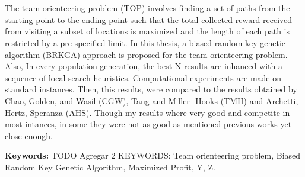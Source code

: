 \chapter*{\tituloAbstractEn}

\noindent The team orienteering problem (TOP) involves finding a set of paths from the starting point to the ending point such that the total collected reward received from visiting a subset of locations is maximized and the length of each path is restricted by a pre-specified limit. In this thesis, a biased random key genetic algorithm (BRKGA) approach is proposed for the team orienteering problem. Also, In every population generation, the best N results are inhanced with a sequence of local search heuristics. Computational experiments are made on standard instances. Then, this results, were compared to the results obtained by Chao, Golden, and Wasil (CGW), Tang and Miller-
Hooks (TMH) and Archetti, Hertz, Speranza (AHS). Though my results where very good and competite in most intances, in some they were not as good as mentioned previous works yet close enough.

\bigskip

\noindent\textbf{Keywords:} TODO Agregar 2 KEYWORDS: Team orienteering problem, Biased Random Key Genetic Algorithm, Maximized Profit, Y, Z.